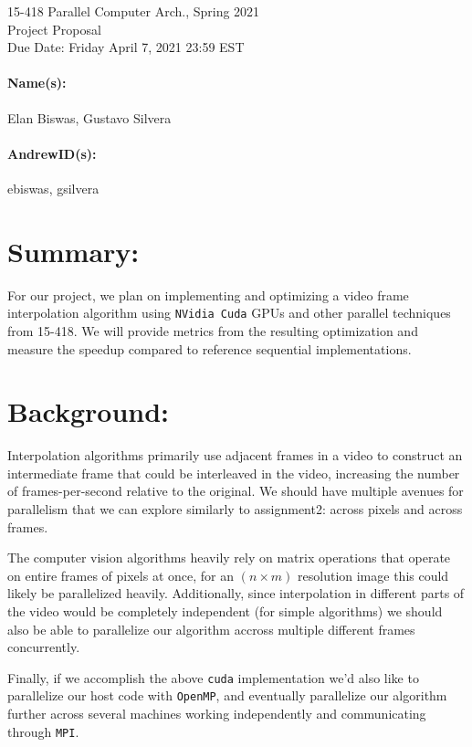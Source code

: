 \documentclass[12pt]{article}
\begin{document}
\begin{centering}
    {\large 15-418 Parallel Computer Arch., Spring 2021\\}
    \vspace{2ex}
    {\LARGE Project Proposal\\}
    \vspace{2ex}
    {\large Due Date: Friday April 7, 2021 23:59 EST\\}
\end{centering}

\bigskip

\paragraph{Name(s):}
Elan Biswas, Gustavo Silvera
\paragraph{AndrewID(s):}
ebiswas, gsilvera

\section*{Summary:} 
\par For our project, we plan on implementing and optimizing a video frame interpolation algorithm using \texttt{NVidia Cuda} GPUs and other parallel techniques from 15-418. We will provide metrics from the resulting optimization and measure the speedup compared to reference sequential implementations.  

\section*{Background:}
\par Interpolation algorithms primarily use adjacent frames in a video to construct an intermediate frame that could be interleaved in the video, increasing the number of frames-per-second relative to the original. We should have multiple avenues for parallelism that we can explore similarly to assignment2: across pixels and across frames. 
\par The computer vision algorithms heavily rely on matrix operations that operate on entire frames of pixels at once, for an $(n \times m)$ resolution image this could likely be parallelized heavily. Additionally, since interpolation in different parts of the video would be completely independent (for simple algorithms) we should also be able to parallelize our algorithm accross multiple different frames concurrently.
\par Finally, if we accomplish the above \texttt{cuda} implementation we'd also like to parallelize our host code with \texttt{OpenMP}, and eventually parallelize our algorithm further across several machines working independently and communicating through \texttt{MPI}.
\end{document}
